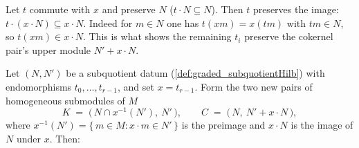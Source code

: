 \begin{lemma}
  \label{lem:graded_map_map_le_of_commute}
  Let \(t\) commute with \(x\) and preserve \(N\) (\(t \cdot N \subseteq N\)). Then
  \(t\) preserves the image: \(t \cdot (x \cdot N) \subseteq x \cdot N\). Indeed for
  \(m \in N\) one has \(t(x m) = x(t m)\) with \(t m \in N\), so \(t(x m) \in x \cdot
  N\). This is what shows the remaining \(t_i\) preserve the cokernel pair's upper
  module \(N' + x \cdot N\).
\end{lemma}

\begin{lemma}
  \label{lem:graded_subquotient_ker_coker}
  Let \((N, N')\) be a subquotient datum (\cref{def:graded_subquotientHilb}) with
  endomorphisms \(t_0, \dots, t_{r-1}\), and set \(x = t_{r-1}\). Form the two new
  pairs of homogeneous submodules of \(M\)
  \[
    K \;=\; \bigl(\,N \cap x^{-1}(N'),\ N'\,\bigr),
    \qquad
    C \;=\; \bigl(\,N,\ N' + x \cdot N\,\bigr),
  \]
  where \(x^{-1}(N') = \{\,m \in M : x \cdot m \in N'\,\}\) is the preimage and
  \(x \cdot N\) is the image of \(N\) under \(x\). Then:
  \begin{enumerate}

\end{enumerate}
\end{lemma}
